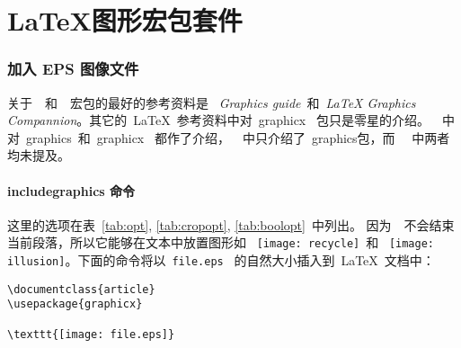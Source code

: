 \part{\LaTeX{}图形宏包套件}

\section{加入 EPS 图像文件}\label{sec:inserteps}

关于~~和~~宏包的最好的参考资料是
~\textsl{Graphics guide}\cite{grfguide}~和~\textsl{\LaTeX{} Graphics
	Compannion}\cite{Michel-1}。其它的~\LaTeX{}~参考资料中对~\textsf{graphicx}~
包只是零星的介绍。~\cite{Helmut}~中对~\textsf{graphics}~和~\textsf{graphicx}~
都作了介绍，~\cite{Leslie}~中只介绍了~\textsf{graphics}包，而~\cite{Michel}~
中两者均未提及。

\subsection{includegraphics 命令}\label{ssec:includegraphics}

{\large\hspace{1cm}
	}

这里的{选项}在表~\ref{tab:opt},
\ref{tab:cropopt}, \ref{tab:boolopt}~中列出。
因为~~不会结束
当前段落，所以它能够在文本中放置图形如
~\texttt{[image: recycle]}~和~
\texttt{[image: illusion]}。下面的命令将以~\texttt{file.eps}~
的自然大小插入到~\LaTeX{}~文档中：

\begin{Verbatim}[xleftmargin=1cm]
\documentclass{article}
\usepackage{graphicx}

\texttt{[image: file.eps]}

\end{Verbatim}

